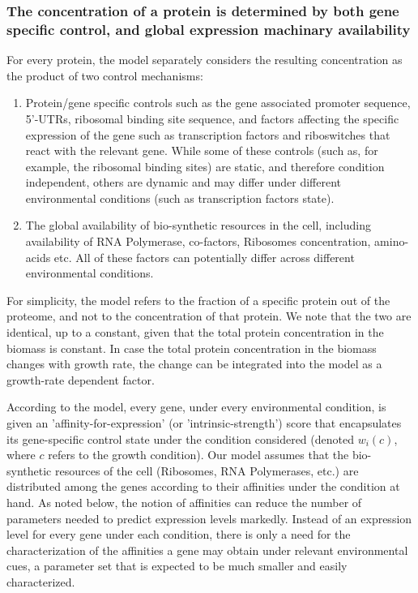 \documentclass[notitlepage]{article}
\begin{document}
\subsubsection{The concentration of a protein is determined by both gene specific control, and global expression machinary availability}
For every protein, the model separately considers the resulting concentration as the product of two control mechanisms:
\begin{enumerate}
\item Protein/gene specific controls such as the gene associated promoter sequence, 5'-UTRs, ribosomal binding site sequence, and factors affecting the specific expression of the gene such as transcription factors and riboswitches that react with the relevant gene.
  While some of these controls (such as, for example, the ribosomal binding sites) are static, and therefore condition independent, others are dynamic and may differ under different environmental conditions (such as transcription factors state).
\item The global availability of bio-synthetic resources in the cell, including availability of RNA Polymerase, co-factors, Ribosomes concentration, amino-acids etc.
  All of these factors can potentially differ across different environmental conditions.
\end{enumerate}
For simplicity, the model refers to the fraction of a specific protein out of the proteome, and not to the concentration of that protein.
We note that the two are identical, up to a constant, given that the total protein concentration in the biomass is constant.
In case the total protein concentration in the biomass changes with growth rate, the change can be integrated into the model as a growth-rate dependent factor.

According to the model, every gene, under every environmental condition, is given an 'affinity-for-expression' (or 'intrinsic-strength') \parencite{Maaloe1969} score that encapsulates its gene-specific control state under the condition considered (denoted $w_i(c)$, where $c$ refers to the growth condition).
Our model assumes that the bio-synthetic resources of the cell (Ribosomes, RNA Polymerases, etc.) are distributed among the genes according to their affinities under the condition at hand.
As noted below, the notion of affinities can reduce the number of parameters needed to predict expression levels markedly.
Instead of an expression level for every gene under each condition, there is only a need for the characterization of the affinities a gene may obtain under relevant environmental cues, a parameter set that is expected to be much smaller and easily characterized.
\end{document}
